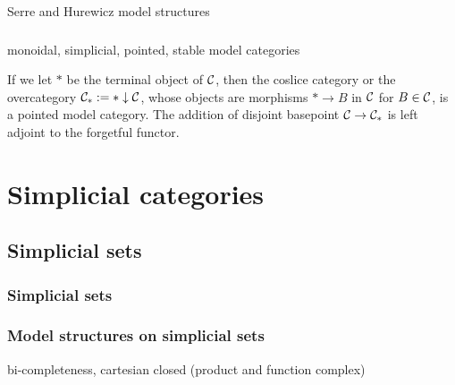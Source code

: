 \documentclass{../../large}
\begin{document}
\begin{prb}
\end{prb}

\begin{prb}[]
Serre and Hurewicz model structures
\end{prb}





\section{}

monoidal, simplicial, pointed, stable model categories

If we let $*$ be the terminal object of $\mathcal{C}$, then the coslice category or the overcategory $\mathcal{C}_*:=*\downarrow\mathcal{C}$, whose objects are morphisms $*\to B$ in $\mathcal{C}$ for $B\in\mathcal{C}$, is a pointed model category.
The addition of disjoint basepoint $\mathcal{C}\to\mathcal{C}_*$ is left adjoint to the forgetful functor.








\part{Simplicial categories}

\chapter{Simplicial sets}

\section{Simplicial sets}


\section{Model structures on simplicial sets}

\begin{prb}

bi-completeness,
cartesian closed (product and function complex)
\end{prb}


\begin{prb}
\end{prb}

\begin{prb}[Anodynes]
\end{prb}
\end{document}
